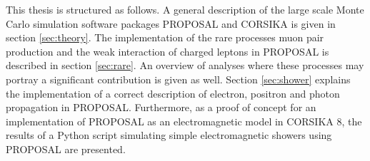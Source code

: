 This thesis is structured as follows.
A general description of the large scale Monte Carlo simulation software packages PROPOSAL and CORSIKA is given in section \ref{sec:theory}.
The implementation of the rare processes muon pair production and the weak interaction of charged leptons in PROPOSAL is described in section \ref{sec:rare}.
An overview of analyses where these processes may portray a significant contribution is given as well.
Section \ref{sec:shower} explains the implementation of a correct description of electron, positron and photon propagation in PROPOSAL.
Furthermore, as a proof of concept for an implementation of PROPOSAL as an electromagnetic model in CORSIKA 8, the results of a Python script simulating simple electromagnetic showers using PROPOSAL are presented.